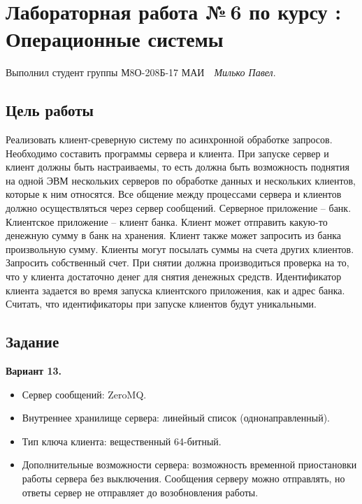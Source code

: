 \documentclass[12pt]{article}
\begin{document}
\section*{\centering Лабораторная работа №\,6 по курсу :\\ Операционные системы}

\noindent Выполнил студент группы М8О-208Б-17 МАИ \,\, \textit{Милько Павел}.

\subsection*{Цель работы}

\noindent Реализовать клиент-среверную систему по асинхронной обработке запросов. Необходимо составить программы сервера и клиента. При запуске сервер и клиент должны быть настраиваемы, то есть должна быть возможность поднятия на одной ЭВМ нескольких серверов по обработке данных и нескольких клиентов, которые к ним относятся. Все общение между процессами сервера и клиентов должно осуществляться
через сервер сообщений. Серверное приложение -- банк. Клиентское приложение -- клиент банка. Клиент может отправить какую-то денежную сумму в банк на хранения. Клиент также может запросить из банка произвольную сумму. Клиенты могут посылать суммы на счета других клиентов. Запросить собственный счет. При снятии должна производиться проверка на то, что у клиента достаточно денег для снятия денежных средств. Идентификатор клиента задается во время запуска клиентского приложения, как и адрес банка. Считать, что идентификаторы при запуске клиентов будут уникальными.



\subsection*{Задание}
\textbf{Вариант 13.}

\begin{itemize}
    \item Сервер сообщений: ZeroMQ.
    \item Внутреннее хранилище сервера: линейный список (однонаправленный).
    \item Тип ключа клиента: вещественный 64-битный.
    \item Дополнительные возможности сервера: возможность временной приостановки работы сервера без выключения. Сообщения серверу можно отправлять, но ответы сервер не отправляет до возобновления работы.
\end{itemize}
\end{document}
